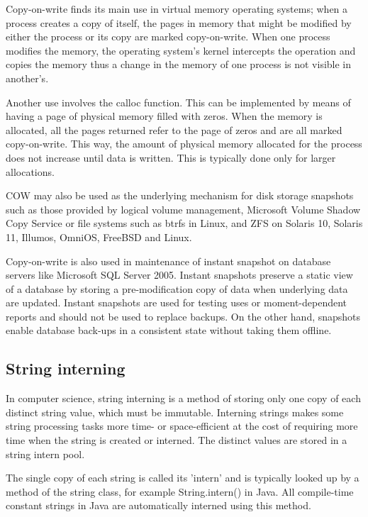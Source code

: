 Copy-on-write finds its main use in virtual memory operating systems; when a process creates a copy of itself, the pages in memory that might be modified by either the process or its copy are marked copy-on-write. When one process modifies the memory, the operating system's kernel intercepts the operation and copies the memory thus a change in the memory of one process is not visible in another's.

Another use involves the calloc function. This can be implemented by means of having a page of physical memory filled with zeros. When the memory is allocated, all the pages returned refer to the page of zeros and are all marked copy-on-write. This way, the amount of physical memory allocated for the process does not increase until data is written. This is typically done only for larger allocations.

COW may also be used as the underlying mechanism for disk storage snapshots such as those provided by logical volume management, Microsoft Volume Shadow Copy Service or file systems such as btrfs in Linux, and ZFS on Solaris 10, Solaris 11, Illumos, OmniOS, FreeBSD and Linux.

Copy-on-write is also used in maintenance of instant snapshot on database servers like Microsoft SQL Server 2005. Instant snapshots preserve a static view of a database by storing a pre-modification copy of data when underlying data are updated. Instant snapshots are used for testing uses or moment-dependent reports and should not be used to replace backups. On the other hand, snapshots enable database back-ups in a consistent state without taking them offline.

\subsection{String interning}

In computer science, string interning is a method of storing only one copy of each distinct string value, which must be immutable. Interning strings makes some string processing tasks more time- or space-efficient at the cost of requiring more time when the string is created or interned. The distinct values are stored in a string intern pool.

The single copy of each string is called its 'intern' and is typically looked up by a method of the string class, for example String.intern() in Java. All compile-time constant strings in Java are automatically interned using this method.

